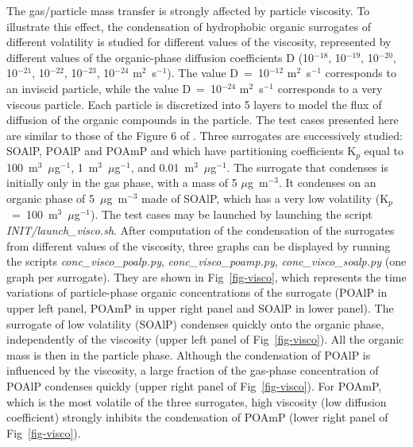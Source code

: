 \documentclass[a4paper,11pt]{article}
\begin{document}
The gas/particle mass transfer is strongly affected by particle viscosity. To
illustrate this effect, the condensation of hydrophobic organic surrogates of different volatility is studied for different
values of the viscosity, represented by different values of the organic-phase
diffusion coefficients D (10$^{-18}$, 10$^{-19}$, 10$^{-20}$,
10$^{-21}$, 10$^{-22}$, 10$^{-23}$, 10$^{-24}$ m$^2$~s$^{-1}$). The value
D~=~10$^{-12}$ m$^2$~s$^{-1}$ corresponds to an inviscid particle, while the value
D~=~10$^{-24}$ m$^2$~s$^{-1}$ corresponds to a very viscous particle.
Each particle is discretized into 5 layers to model the flux of diffusion of the
organic compounds in the particle. 
The test cases presented here are similar to those of the Figure 6 of \cite{couvidat2015}. 
Three surrogates are successively studied: SOAlP, POAlP and POAmP and  which have 
 partitioning coefficients K$_p$ equal to 100~m$^3$~$\mu$g$^{-1}$,
 1~m$^3$~$\mu$g$^{-1}$, and 0.01~m$^3$~$\mu$g$^{-1}$.
The surrogate that condenses is initially only in the gas
phase, with a mass of 5 $\mu$g~m$^{-3}$. It condenses on an organic phase of
5~$\mu$g~m$^{-3}$ made of SOAlP, which has a very low volatility (K$_p$~=~100~m$^3$~$\mu$g$^{-1}$).
The test cases may be launched by launching the script
 {\it{INIT/launch\_visco.sh}}. After computation of the condensation of the surrogates
from different values of the viscosity, three graphs can be displayed by
running the scripts {\it{conc\_visco\_poalp.py}}, {\it{conc\_visco\_poamp.py}},
{\it{conc\_visco\_soalp.py}} (one graph per surrogate). They are shown in 
Fig~\ref{fig-visco}, which represents the time variations of particle-phase organic
concentrations of the surrogate (POAlP in upper left panel, POAmP in upper
right panel and SOAlP in lower panel). 
The surrogate of low volatility (SOAlP) condenses quickly onto the organic
phase, independently of the viscosity (upper left panel of Fig~\ref{fig-visco}). All the organic mass is then in the
particle phase.  
Although the condensation of POAlP is influenced by the viscosity, a large fraction of the gas-phase concentration of POAlP condenses quickly (upper right panel of Fig~\ref{fig-visco}).
For POAmP, which is the most volatile of the three surrogates, high viscosity
(low diffusion coefficient) strongly inhibits the condensation of POAmP (lower right panel of Fig~\ref{fig-visco}).
\end{document}

